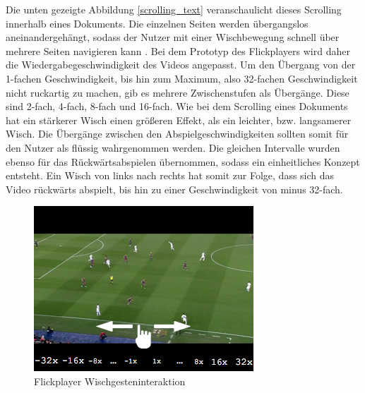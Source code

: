\documentclass[11pt,a4paper]{report}
\begin{document}
Die unten gezeigte Abbildung \ref{scrolling_text} veranschaulicht dieses Scrolling innerhalb eines Dokuments. Die einzelnen Seiten werden übergangslos aneinandergehängt, sodass der Nutzer mit einer Wischbewegung schnell über mehrere Seiten navigieren kann \cite{hurst2008interfaces}. Bei dem Prototyp des Flickplayers wird daher die Wiedergabegeschwindigkeit des Videos angepasst. Um den Übergang von der 1-fachen Geschwindigkeit, bis hin zum Maximum, also 32-fachen Geschwindigkeit nicht ruckartig zu machen, gib es mehrere Zwischenstufen als Übergänge. Diese sind 2-fach, 4-fach, 8-fach und 16-fach. Wie bei dem Scrolling eines Dokuments hat ein stärkerer Wisch einen größeren Effekt, als ein leichter, bzw. langsamerer Wisch. Die Übergänge zwischen den Abspielgeschwindigkeiten sollten somit für den Nutzer als flüssig wahrgenommen werden. Die gleichen Intervalle wurden ebenso für das Rückwärtsabspielen übernommen, sodass ein einheitliches Konzept entsteht. Ein Wisch von links nach rechts hat somit zur Folge, dass sich das Video rückwärts abspielt, bis hin zu einer Geschwindigkeit von minus 32-fach.
\begin{figure}[h]
\begin{center}
\includegraphics[scale=1.1]{./images/17.png}
\caption{Flickplayer Wischgesteninteraktion}
\label{finger_bild}
\end{center}
\end{figure}
\end{document}
